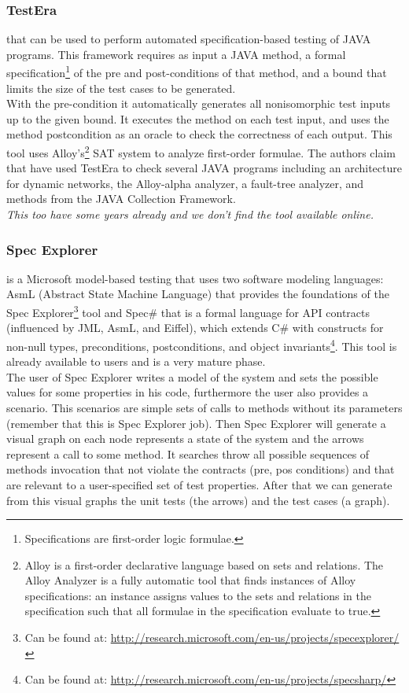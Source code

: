 \documentclass[10pt, conference, compsocconf]{IEEEtran}
\begin{document}
\subsubsection{\textbf{TestEra}\cite{testera}}
that can be used to perform automated specification-based testing of
JAVA programs. This framework requires as input a JAVA method, a formal specification\footnote{Specifications are first-order logic formulae.}
of the pre and post-conditions of that method, and
a bound that limits the size of the test cases to be generated.\\
With the pre-condition it automatically generates all nonisomorphic test inputs up to the given bound.
It executes the method on each test input, and uses the method postcondition as an oracle to check the correctness of each output. This tool
uses Alloy's\footnote{Alloy is a first-order declarative language based on sets and relations. The Alloy Analyzer is a fully
automatic tool that finds instances of Alloy specifications: an instance
assigns values to the sets and relations in the specification such that
all formulae in the specification evaluate to true.}
SAT system to analyze first-order  formulae.
The authors claim that have used TestEra to check several JAVA programs including an architecture for
dynamic networks, the Alloy-alpha analyzer, a fault-tree analyzer, and methods from the JAVA Collection Framework.\\
\textit{This too have some years already and we don't find the tool available online.}

\subsubsection{\textbf{Spec Explorer}} is a Microsoft model-based testing that uses two software modeling languages:
AsmL (Abstract State Machine Language) that provides the foundations of the Spec Explorer\footnote{Can be found at: \url{http://research.microsoft.com/en-us/projects/specexplorer/}} tool
and Spec\# that is a formal language for API contracts (influenced by JML, AsmL, and Eiffel), which extends C\# with constructs for non-null types,
preconditions, postconditions, and object invariants\footnote{Can be found at: \url{http://research.microsoft.com/en-us/projects/specsharp/}}.
This tool is already available to users and is a very mature phase.\\

The user of Spec Explorer writes a model of the system and sets the possible values for some properties in his code, furthermore the user also provides a scenario.
This scenarios are simple sets of calls to methods without its parameters (remember that this is Spec Explorer job).
Then Spec Explorer will generate a visual graph on each node represents a state of the system and the arrows represent a call to some method.
It searches throw all possible sequences of methods invocation that not violate the contracts (pre, pos conditions) and
that are relevant to a user-specified set of test properties. After that we can generate from this visual graphs the unit tests (the arrows) and the
test cases (a graph).
\end{document}
